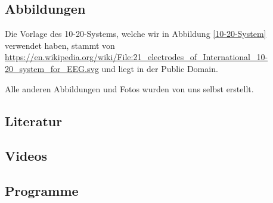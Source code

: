 \documentclass[11pt]{scrartcl}
\begin{document}
	\subsection{Abbildungen}

	Die Vorlage des 10-20-Systems, welche wir in Abbildung \ref{10-20-System} verwendet haben, stammt von \url{https://en.wikipedia.org/wiki/File:21_electrodes_of_International_10-20_system_for_EEG.svg} und liegt in der Public Domain.
	
	Alle anderen Abbildungen und Fotos wurden von uns selbst erstellt.

	\subsection{Literatur}
	\printbibliography[heading=none, keyword={Literatur}, notkeyword={YTVideos}]

	\subsection{Videos}
	\printbibliography[heading=none, keyword={YTVideos}]

	\subsection{Programme}
	\printbibliography[heading=none, keyword=Programme]
\end{document}
